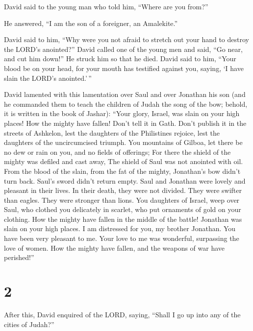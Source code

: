  David said to the young man who told him, ``Where are
you from?''

He answered, ``I am the son of a foreigner, an Amalekite.''

 David said to him, ``Why were you not afraid to stretch
out your hand to destroy the LORD's anointed?''  David
called one of the young men and said, ``Go near, and cut him down!'' He
struck him so that he died.  David said to him, ``Your
blood be on your head, for your mouth has testified against you, saying,
`I have slain the LORD's anointed.'\,''

 David lamented with this lamentation over Saul and over
Jonathan his son  (and he commanded them to teach the
children of Judah the song of the bow; behold, it is written in the book
of Jashar):  ``Your glory, Israel, was slain on your high
places! How the mighty have fallen!  Don't tell it in
Gath. Don't publish it in the streets of Ashkelon, lest the daughters of
the Philistines rejoice, lest the daughters of the uncircumcised
triumph.  You mountains of Gilboa, let there be no dew or
rain on you, and no fields of offerings; For there the shield of the
mighty was defiled and cast away, The shield of Saul was not anointed
with oil.  From the blood of the slain, from the fat of
the mighty, Jonathan's bow didn't turn back. Saul's sword didn't return
empty.  Saul and Jonathan were lovely and pleasant in
their lives. In their death, they were not divided. They were swifter
than eagles. They were stronger than lions.  You
daughters of Israel, weep over Saul, who clothed you delicately in
scarlet, who put ornaments of gold on your clothing.  How
the mighty have fallen in the middle of the battle! Jonathan was slain
on your high places.  I am distressed for you, my brother
Jonathan. You have been very pleasant to me. Your love to me was
wonderful, surpassing the love of women.  How the mighty
have fallen, and the weapons of war have perished!''

\hypertarget{section-1}{%
\section{2}\label{section-1}}

 After this, David enquired of the LORD, saying, ``Shall I
go up into any of the cities of Judah?''

